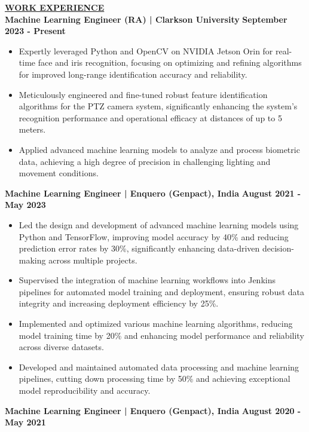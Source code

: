 \documentclass{article}
\begin{document}
\noindent \textbf{\underline{WORK EXPERIENCE}}\\
\noindent \textbf{Machine Learning Engineer (RA) | Clarkson University} \hfill \textbf{September 2023 - Present}
\begin{itemize}[noitemsep,nolistsep,leftmargin=*]
\item {\small Expertly leveraged Python and OpenCV on NVIDIA Jetson Orin for real-time face and iris recognition, focusing on optimizing and refining algorithms for improved long-range identification accuracy and reliability.}
\item {\small Meticulously engineered and fine-tuned robust feature identification algorithms for the PTZ camera system, significantly enhancing the system's recognition performance and operational efficacy at distances of up to 5 meters.}
\item {\small Applied advanced machine learning models to analyze and process biometric data, achieving a high degree of precision in challenging lighting and movement conditions.}
\end{itemize}
\vspace{1mm} 
\noindent \textbf{Machine Learning Engineer | Enquero (Genpact), India} \hfill \textbf{August 2021 - May 2023}
\begin{itemize}[noitemsep,nolistsep,leftmargin=*]
\item {\small Led the design and development of advanced machine learning models using Python and TensorFlow, improving model accuracy by 40\% and reducing prediction error rates by 30\%, significantly enhancing data-driven decision-making across multiple projects.}
\item {\small Supervised the integration of machine learning workflows into Jenkins pipelines for automated model training and deployment, ensuring robust data integrity and increasing deployment efficiency by 25\%.}
\item {\small Implemented and optimized various machine learning algorithms, reducing model training time by 20\% and enhancing model performance and reliability across diverse datasets.}
\item {\small Developed and maintained automated data processing and machine learning pipelines, cutting down processing time by 50\% and achieving exceptional model reproducibility and accuracy.}
\end{itemize}
\vspace{1mm}
\noindent \textbf{Machine Learning Engineer | Enquero (Genpact), India} \hfill \textbf{August 2020 - May 2021}
\end{document}
